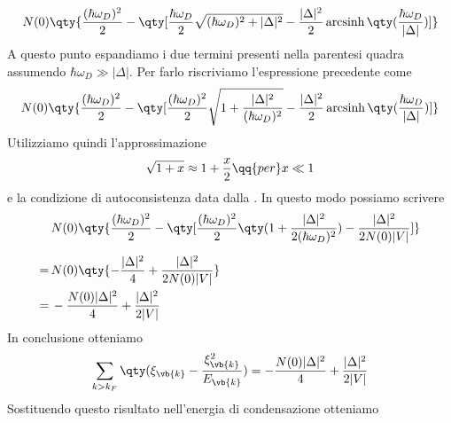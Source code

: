 \begin{equation*}
   N(0)
   \qty{
      \frac{(\hbar \omega_D)^2}{2}
      -
      \qty[
         \frac{\hbar \omega_D}{2}
         \sqrt{
            (\hbar \omega_D)^2 + |\Delta|^2
         }
         -
         \frac{|\Delta|^2}{2}
         \operatorname{arcsinh}
         \qty(
            \frac{\hbar \omega_D}{|\Delta|}
         )
      ]
   }
\end{equation*}
A questo punto espandiamo i due termini presenti nella parentesi quadra assumendo $\hbar \omega_D \gg |\Delta|$. Per farlo riscriviamo l'espressione precedente come
\begin{equation*}
   N(0)
   \qty{
      \frac{(\hbar \omega_D)^2}{2}
      -
      \qty[
         \frac{(\hbar \omega_D)^2}{2}
         \sqrt{
            1
            +
            \frac{|\Delta|^2}{(\hbar \omega_D)^2}
         }
         -
         \frac{|\Delta|^2}{2}
         \operatorname{arcsinh}
         \qty(
            \frac{\hbar \omega_D}{|\Delta|}
         )
      ]
   }
\end{equation*}
Utilizziamo quindi l'approssimazione
\begin{equation*}
   \sqrt{1+x}\approx 1+\frac{x}{2}
   \qq{per} x\ll 1
\end{equation*}
e la condizione di autoconsistenza data dalla . In questo modo possiamo scrivere
\begin{equation*}
   \begin{split}
      &
      N(0)
      \qty{
         \frac{(\hbar \omega_D)^2}{2}
         -
         \qty[
            \frac{(\hbar \omega_D)^2}{2}
            \qty(
               1
               +
               \frac{|\Delta|^2}{2(\hbar \omega_D)^2}
            )
            -
            \frac{|\Delta|^2}{2N(0)|V|}
         ]
      }
      \\[0.2cm]
      =\,&
      N(0)
      \qty{
         -\frac{|\Delta|^2}{4}
         +
         \frac{|\Delta|^2}{2N(0)|V|}
      }
      \\
      =\,&
      -\frac{N(0)|\Delta|^2}{4}
      +
      \frac{|\Delta|^2}{2|V|}
   \end{split}
\end{equation*}
In conclusione otteniamo
\begin{equation*}
   \sum_{k > k_F}
   \qty(
   \xi_{\vb{k}}
   -
   \frac{\xi^2_{\vb{k}}}{E_{\vb{k}}}
   )
   =
   -\frac{N(0)|\Delta|^2}{4}
   +
   \frac{|\Delta|^2}{2|V|}
\end{equation*}
Sostituendo questo risultato nell'energia di condensazione otteniamo
